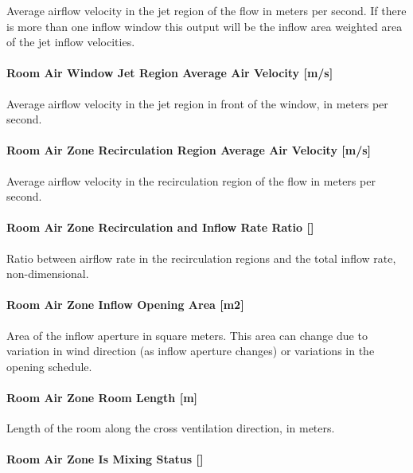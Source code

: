 Average airflow velocity in the jet region of the flow in meters per second. If there is more than one inflow window this output will be the inflow area weighted area of the jet inflow velocities.

\paragraph{Room Air Window Jet Region Average Air Velocity {[}m/s{]}}\label{room-air-window-jet-region-average-air-velocity-ms}

Average airflow velocity in the jet region in front of the window, in meters per second.

\paragraph{Room Air Zone Recirculation Region Average Air Velocity {[}m/s{]}}\label{room-air-zone-recirculation-region-average-air-velocity-ms}

Average airflow velocity in the recirculation region of the flow in meters per second.

\paragraph{Room Air Zone Recirculation and Inflow Rate Ratio {[]}}\label{room-air-zone-recirculation-and-inflow-rate-ratio}

Ratio between airflow rate in the recirculation regions and the total inflow rate, non-dimensional.

\paragraph{Room Air Zone Inflow Opening Area {[}m2{]}}\label{room-air-zone-inflow-opening-area-m2}

Area of the inflow aperture in square meters. This area can change due to variation in wind direction (as inflow aperture changes) or variations in the opening schedule.

\paragraph{Room Air Zone Room Length {[}m{]}}\label{room-air-zone-room-length-m}

Length of the room along the cross ventilation direction, in meters.

\paragraph{Room Air Zone Is Mixing Status {[]}}\label{room-air-zone-is-mixing-status}

